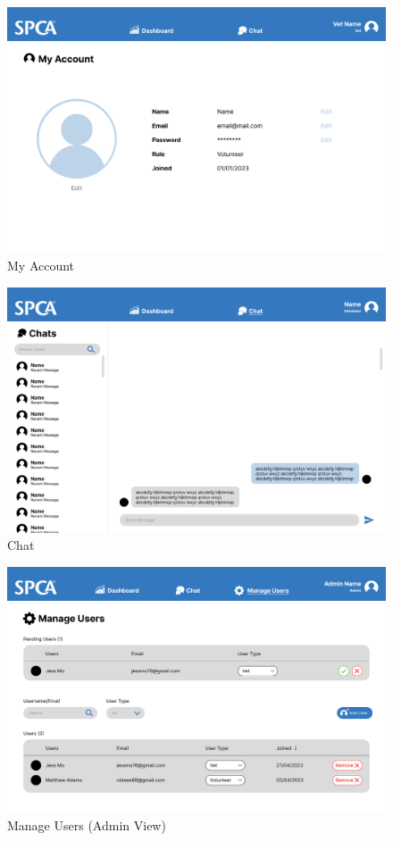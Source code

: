 \begin{figure}[h]
\centering
\includegraphics[width=\textwidth]{proposal/parts/my-account.png}
\caption{My Account}
\end{figure}

\begin{figure}[h]
\centering
\includegraphics[width=\textwidth]{proposal/parts/chat.png}
\caption{Chat}
\end{figure}

\begin{figure}[h]
\centering
\includegraphics[width=\textwidth]{proposal/parts/admin-manage-users.png}
\caption{Manage Users (Admin View)}
\end{figure}

